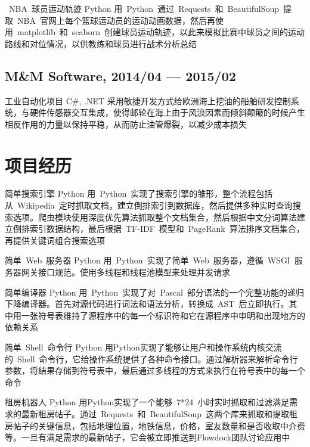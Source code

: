 \documentclass[11pt,a4paper]{moderncv}
\begin{document}
\vspace*{0.2\baselineskip}
\cventry{}
{~NBA~球员运动轨迹}
{Python}
{}{}
{
用~Python~通过~Requests~和~BeautifulSoup~提取~NBA~官网上每个篮球运动员的运动动画数据，然后再使用~matplotlib~和~seaborn~创建球员运动轨迹，以此来模拟比赛中球员之间的运动路线和对位情况，以供教练和球员进行战术分析总结
}

\subsection{M\&M Software, 2014/04 --- 2015/02}
\renewcommand{\baselinestretch}{1.0}
\cventry{}
{工业自动化项目}
{C\#, .NET}
{}{}
{
采用敏捷开发方式给欧洲海上挖油的船舶研发控制系统，与硬件传感器交互集成，使得邮轮在海上由于风浪因素而倾斜颠簸的时候产生相反作用的力量以保持平稳，从而防止油管爆裂，以减少成本损失
}

\section{项目经历}
\renewcommand{\baselinestretch}{1.2}

\cventry{}
{简单搜索引擎}
{Python}
{}{}
{
用~Python~实现了搜索引擎的雏形，整个流程包括从~Wikipedia~定时抓取文档，建立倒排索引到数据库，然后提供多种实时查询搜索选项。爬虫模块使用深度优先算法抓取整个文档集合，然后根据中文分词算法建立倒排索引数据结构，最后根据~TF-IDF~模型和~PageRank~算法排序文档集合，再提供关键词组合搜索选项
}

\vspace*{0.2\baselineskip}
\cventry{}
{简单~Web~服务器}
{Python}
{}{}
{
用~Python~实现了简单~Web~服务器，遵循~WSGI~服务器网关接口规范。使用多线程和线程池模型来处理并发请求
}

\vspace*{0.2\baselineskip}
\cventry{}
{简单编译器}
{Python}
{}{}
{
用~Python~实现了对~Pascal~部分语法的一个完整功能的递归下降编译器。首先对源代码进行词法和语法分析，转换成~AST~后立即执行。其中用一张符号表维持了源程序中的每一个标识符和它在源程序中申明和出现地方的依赖关系
}

\vspace*{0.2\baselineskip}
\cventry{}
{简单~Shell~命令行}
{Python}
{}{}
{用Python实现了能够让用户和操作系统内核交流的~Shell~命令行，它给操作系统提供了各种命令接口。通过解析器来解析命令行参数，将结果存储到符号表中，最后通过多线程的方式来执行在符号表中的每一个命令}

\vspace*{0.2\baselineskip}
\cventry{}
{租房机器人}
{Python}
{}{}
{
用Python实现了一个能够~7*24~小时实时抓取和过滤满足需求的最新租房帖子。通过~Requests~和~BeautifulSoup~这两个库来抓取和提取租房帖子的关键信息，包括地理位置，地铁信息，价格，室友数量和是否收取中介费等。一旦有满足需求的最新帖子，它会被立即推送到Flowdock团队讨论应用中
}
\end{document}
